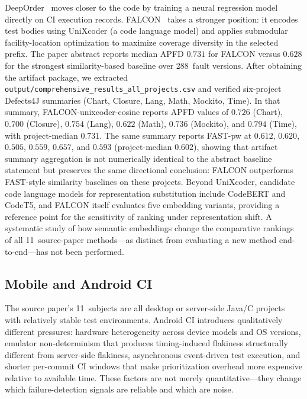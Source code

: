 \documentclass[10pt,conference]{IEEEtran}
\begin{document}
DeepOrder~\cite{deeporder} moves closer to the code by training a neural regression model directly on CI execution records. FALCON~\cite{falcon} takes a stronger position: it encodes test bodies using UniXcoder (a code language model) and applies submodular facility-location optimization to maximize coverage diversity in the selected prefix. The paper abstract reports median APFD $0.731$ for FALCON versus $0.628$ for the strongest similarity-based baseline over 288~fault versions. After obtaining the artifact package, we extracted \texttt{output/comprehensive\_results\_all\_projects.csv} and verified six-project Defects4J summaries (Chart, Closure, Lang, Math, Mockito, Time). In that summary, FALCON-unixcoder-cosine reports APFD values of $0.726$ (Chart), $0.700$ (Closure), $0.754$ (Lang), $0.622$ (Math), $0.736$ (Mockito), and $0.794$ (Time), with project-median $0.731$. The same summary reports FAST-pw at $0.612$, $0.620$, $0.505$, $0.559$, $0.657$, and $0.593$ (project-median $0.602$), showing that artifact summary aggregation is not numerically identical to the abstract baseline statement but preserves the same directional conclusion: FALCON outperforms FAST-style similarity baselines on these projects. Beyond UniXcoder, candidate code language models for representation substitution include CodeBERT and CodeT5, and FALCON itself evaluates five embedding variants, providing a reference point for the sensitivity of ranking under representation shift. A systematic study of how semantic embeddings change the comparative rankings of all 11~source-paper methods---as distinct from evaluating a new method end-to-end---has not been performed.

\subsection{Mobile and Android CI}

The source paper's 11~subjects are all desktop or server-side Java/C projects with relatively stable test environments. Android CI introduces qualitatively different pressures: hardware heterogeneity across device models and OS versions, emulator non-determinism that produces timing-induced flakiness structurally different from server-side flakiness, asynchronous event-driven test execution, and shorter per-commit CI windows that make prioritization overhead more expensive relative to available time. These factors are not merely quantitative---they change which failure-detection signals are reliable and which are noise.
\end{document}

